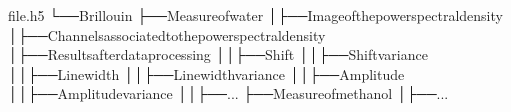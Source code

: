 \documentclass[letterpaper,10pt,english]{sphinxmanual}
\begin{document}
\begin{sphinxVerbatim}[commandchars=\\\{\}]
file.h5
└──Brillouin
├──Measureofwater
│├──Imageofthepowerspectraldensity
│├──Channelsassociatedtothepowerspectraldensity
│├──Resultsafterdataprocessing
││├──Shift
││├──Shiftvariance
││├──Linewidth
││├──Linewidthvariance
││├──Amplitude
││├──Amplitudevariance
││├──...
├──Measureofmethanol
│├──...
\end{sphinxVerbatim}
\end{document}
